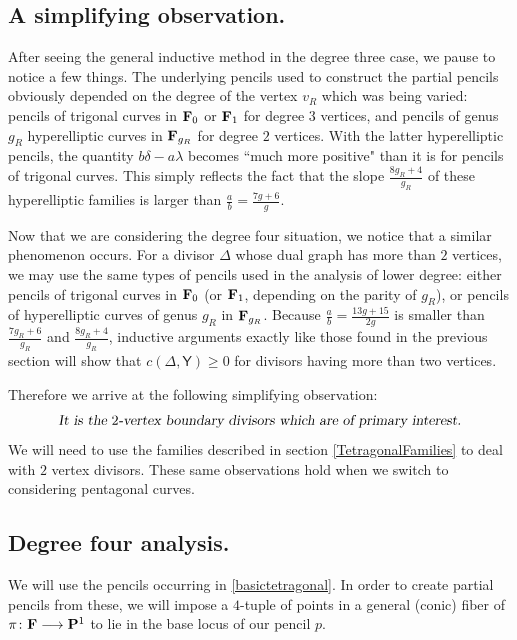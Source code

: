 \documentclass[reqno, 10 pt]{article}
\theoremstyle{definition}
\theoremstyle{remark}
\numberwithin{equation}{section}
\numberwithin{thm}{section}
\numberwithin{prop}{section}
\numberwithin{lem}{section}
\numberwithin{cor}{section}
\numberwithin{conj}{section}
\numberwithin{defn}{section}
\newcommand{\F}{{\mathbf F}}
\newcommand{\sfY}{{\mathsf Y}}
\renewcommand{\F}{{\bf F}}
\begin{document}
\subsection{A simplifying observation.}
After seeing the general inductive method in the degree three case, we pause to notice a few things.  The underlying pencils used to construct the partial pencils obviously depended on the degree of the vertex $v_R$ which was being varied: pencils of trigonal curves in ${\bf F}_{0}$ or ${\bf F}_{1}$ for degree $3$ vertices, and pencils of genus $g_R$ hyperelliptic curves in ${\bf F}_{g_R }$ for degree $2$ vertices.   With  the latter hyperelliptic pencils, the quantity $b\delta - a\lambda$ becomes ``much more positive" than it is for pencils of trigonal curves.  This simply reflects the fact that the slope $\frac{8g_{R} +4}{g_{R}}$ of these hyperelliptic families is larger than  $\frac{a}{b} = \frac{7g+6}{g}$.  

Now that we are considering the degree four situation, we notice that a similar phenomenon occurs.  For a divisor $\Delta$ whose dual graph has more than $2$ vertices, we may use the same types of pencils used in the analysis of lower degree: either pencils of trigonal curves in ${\bf F}_{0}$ (or $\F_{1}$, depending on the parity of $g_{R}$), or pencils of hyperelliptic curves of genus $g_R$ in ${\bf F}_{g_R}$.  Because $\frac{a}{b} = \frac{13g+ 15}{2g} $ is  smaller than $\frac{7g_R+6}{g_R}$ and $\frac{8g_R+4}{g_R}$, inductive arguments exactly like those found in the previous section will show that $c(\Delta, \sfY) \geq 0$ for divisors having more than two vertices.

Therefore we arrive at the following simplifying observation: $$\text{\sl It is the $2$-vertex boundary divisors which are of primary interest.}$$  We will need to use the families described in section \ref{TetragonalFamilies} to deal with $2$ vertex divisors.  These same observations hold when we switch to considering pentagonal curves.


\subsection{Degree four analysis.}


We will use the pencils occurring in \autoref{basictetragonal}.  In order to create partial pencils from these, we will impose a $4$-tuple of points in a general (conic) fiber of $\pi \colon \F \longrightarrow {\bf P}^1$ to lie in the base locus of our pencil $p$.  
\end{document}
